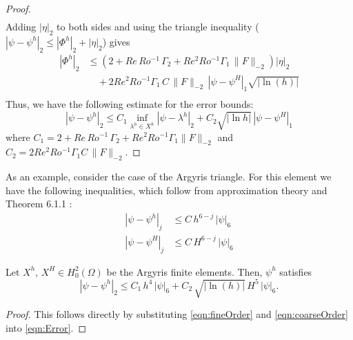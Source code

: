 \begin{proof}
\begin{align*}
  \end{align*}
  Adding $|\eta|_2$ to both sides and using the triangle inequality ($|\psi -
  \psi^h|_2 \le |\Phi^h|_2 + |\eta|_2$) gives
  \begin{align*}
    |\Phi^h|_2 &\le \left(2 + Re\, Ro^{-1}\, \Gamma_2 + Re^2 Ro^{-1} \Gamma_1\,
      \|F\|_{-2}\right) |\eta|_2 \\
    &\quad + 2 Re^2 Ro^{-1} \Gamma_1\, C\, \|F\|_{-2}\, |\psi - \psi^H|_1
      \sqrt{|\ln(h)|} \\
  \end{align*}
  Thus, we have the following estimate for the error bounds:
  \begin{equation*}
    |\psi-\psi^h|_2 \le C_1 \inf_{\lambda^h\in X^h} |\psi-\lambda^h|_2 + C_2
      \sqrt{|\ln h|}\, |\psi - \psi^H|_1
  \end{equation*}
  where $C_1 = 2 + Re\,Ro^{-1}\, \Gamma_2 + Re^2 Ro^{-1} \Gamma_1 \|F\|_{-2}$
  and $C_2= 2 Re^2 Ro^{-1} \Gamma_1 C\,\|F\|_{-2}$.
\end{proof}

As an example, consider the case of the Argyris triangle. For this element we
have the following inequalities, which follow from approximation theory
\cite{Bernadou94} and Theorem 6.1.1 \cite{Ciarlet}:
\begin{align}
  |\psi - \psi^h|_j &\le C\,h^{6-j}\, |\psi|_6 \label{eqn:fineOrder} \\
  |\psi - \psi^H|_j &\le C\,H^{6-j}\, |\psi|_6  \label{eqn:coarseOrder}
\end{align}
\begin{corollary} \label{crl:Argyris2L}
  Let $X^h,\, X^H \in H^2_0(\Omega)$ be the Argyris finite elements. Then,
  $\psi^h$ satisfies
  \begin{equation}
    |\psi - \psi^h|_2 \le C_1\, h^4\, |\psi|_6 + C_2\, \sqrt{|\ln(h)|}\, H^5\,
      |\psi|_6.
    \label{eqn:TwoLevelError}
  \end{equation}
\end{corollary}
\begin{proof}
  This follows directly by substituting \eqref{eqn:fineOrder} and
  \eqref{eqn:coarseOrder} into \eqref{eqn:Error}.
\end{proof}
